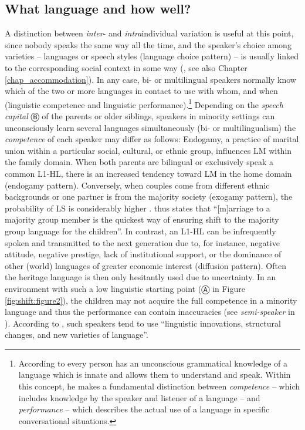 \documentclass[output=paper]{langscibook}
\begin{document}
\subsection{What language and how well?}

A distinction between \emph{inter}- and \emph{intra}individual variation is useful at this point, since nobody speaks the same way all the time, and the speaker's choice among varieties -- languages or speech styles (language choice pattern) -- is usually linked to the corresponding social context in some way (\cite[12--17]{Gal1979}, see also Chapter \ref{chap_accommodation}). In any case, bi- or multilingual speakers normally know which of the two or more languages in contact to use with whom, and when (linguistic competence and linguistic performance).\footnote{According to \textcite[3]{Chomsky1965} every person has an unconscious grammatical knowledge of a language which is innate and allows them to understand and speak. Within this concept, he makes a fundamental distinction between \emph{competence} -- which includes knowledge by the speaker and listener of a language -- and \emph{performance} -- which describes the actual use of a language in specific conversational situations.} Depending on the \emph{speech capital} Ⓑ of the parents or older siblings, speakers in minority settings can unconsciously learn several languages simultaneously (bi- or multilingualism) the \emph{competence} of each speaker may differ as follows: Endogamy, a practice of marital union within a particular social, cultural, or ethnic group, influences LM within the family domain. When both parents are bilingual or exclusively speak a common L1-HL, there is an increased tendency toward LM in the home domain (endogamy pattern). Conversely, when couples come from different ethnic backgrounds or one partner is from the majority society (exogamy pattern), the probability of LS is considerably higher \parencite[89]{Pauwels2016}. \textcite[65]{Holmes2013} thus states that ``{[}m{]}arriage to a majority group member is the quickest way of ensuring shift to the majority group language for the children''. In contrast, an L1-HL can be infrequently spoken and transmitted to the next generation due to, for instance, negative attitude, negative prestige, lack of institutional support, or the dominance of other (world) languages of greater economic interest (diffusion pattern). Often the heritage language is then only hesitantly used due to uncertainty. In an environment with such a low linguistic starting point (Ⓐ in Figure \ref{fig:shift:figure2}), the children may not acquire the full competence in a minority language and thus the performance can contain inaccuracies (see \emph{semi-speaker} in \cite[87]{Dorian1980}). According to \textcite[116]{Wei2002}, such speakers tend to use ``linguistic innovations, structural changes, and new varieties of language''.
\end{document}
